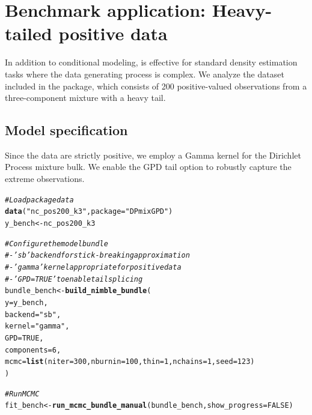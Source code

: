 \documentclass[article]{jss}\usepackage[]{graphicx}\usepackage[]{xcolor}
\makeatletter
\newcommand{\hlnum}[1]{\textcolor[rgb]{0.686,0.059,0.569}{#1}}%
\newcommand{\hlsng}[1]{\textcolor[rgb]{0.192,0.494,0.8}{#1}}%
\newcommand{\hlcom}[1]{\textcolor[rgb]{0.678,0.584,0.686}{\textit{#1}}}%
\newcommand{\hldef}[1]{\textcolor[rgb]{0.345,0.345,0.345}{#1}}%
\newcommand{\hlkwb}[1]{\textcolor[rgb]{0.69,0.353,0.396}{#1}}%
\newcommand{\hlkwc}[1]{\textcolor[rgb]{0.333,0.667,0.333}{#1}}%
\newcommand{\hlkwd}[1]{\textcolor[rgb]{0.737,0.353,0.396}{\textbf{#1}}}%
\newenvironment{kframe}{%
 \def\at@end@of@kframe{}%
 \ifinner\ifhmode%
  \def\at@end@of@kframe{\end{minipage}}%
  \begin{minipage}{\columnwidth}%
 \fi\fi%
 \def\FrameCommand##1{\hskip\@totalleftmargin \hskip-\fboxsep
 \colorbox{shadecolor}{##1}\hskip-\fboxsep
     \hskip-\linewidth \hskip-\@totalleftmargin \hskip\columnwidth}%
 \MakeFramed {\advance\hsize-\width
   \@totalleftmargin\z@ \linewidth\hsize
   \@setminipage}}%
 {\par\unskip\endMakeFramed%
 \at@end@of@kframe}
\newenvironment{knitrout}{}{} %
\makeatother
\begin{document}
\section{Benchmark application: Heavy-tailed positive data}

In addition to conditional modeling,  is effective for standard density estimation tasks where the data generating process is complex. We analyze the  dataset included in the package, which consists of 200 positive-valued observations from a three-component mixture with a heavy tail.

\subsection{Model specification}

Since the data are strictly positive, we employ a Gamma kernel for the Dirichlet Process mixture bulk. We enable the GPD tail option to robustly capture the extreme observations.

\begin{knitrout}
\color{fgcolor}\begin{kframe}
\begin{alltt}
\hlcom{# Load package data}
\hlkwd{data}\hldef{(}\hlsng{"nc_pos200_k3"}\hldef{,} \hlkwc{package} \hldef{=} \hlsng{"DPmixGPD"}\hldef{)}
\hldef{y_bench} \hlkwb{<-} \hldef{nc_pos200_k3}

\hlcom{# Configure the model bundle}
\hlcom{# - 'sb' backend for stick-breaking approximation}
\hlcom{# - 'gamma' kernel appropriate for positive data}
\hlcom{# - 'GPD = TRUE' to enable tail splicing}
\hldef{bundle_bench} \hlkwb{<-} \hlkwd{build_nimble_bundle}\hldef{(}
  \hlkwc{y} \hldef{= y_bench,}
  \hlkwc{backend} \hldef{=} \hlsng{"sb"}\hldef{,}
  \hlkwc{kernel} \hldef{=} \hlsng{"gamma"}\hldef{,}
  \hlkwc{GPD} \hldef{=} \hlnum{TRUE}\hldef{,}
  \hlkwc{components} \hldef{=}\hlnum{6}\hldef{,}
  \hlkwc{mcmc} \hldef{=} \hlkwd{list}\hldef{(}\hlkwc{niter} \hldef{=} \hlnum{300}\hldef{,} \hlkwc{nburnin} \hldef{=} \hlnum{100}\hldef{,} \hlkwc{thin} \hldef{=} \hlnum{1}\hldef{,} \hlkwc{nchains} \hldef{=} \hlnum{1}\hldef{,} \hlkwc{seed} \hldef{=} \hlnum{123}\hldef{)}
\hldef{)}
\end{alltt}


{\ttfamily\noindent\bfseries\color{errorcolor}{\#\# Error in `build\_nimble\_bundle()`:\\\#\# ! 'list' object cannot be coerced to type 'double'}}\begin{alltt}
\hlcom{# Run MCMC}
\hldef{fit_bench} \hlkwb{<-} \hlkwd{run_mcmc_bundle_manual}\hldef{(bundle_bench,} \hlkwc{show_progress} \hldef{=} \hlnum{FALSE}\hldef{)}
\end{alltt}


{\ttfamily\noindent\bfseries\color{errorcolor}{\#\# Error:\\\#\# ! object 'bundle\_bench' not found}}\end{kframe}
\end{knitrout}
\end{document}
